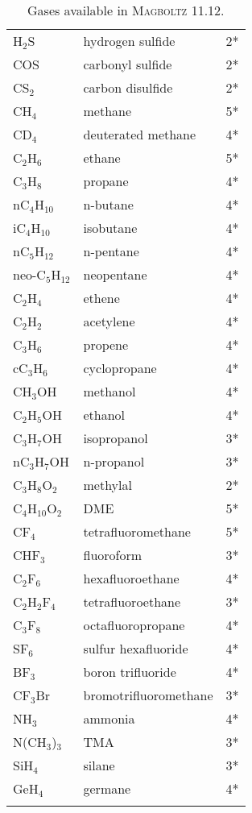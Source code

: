 \begin{appendix}
\begin{longtable}{l l l}
  H\(_{2}\)S & hydrogen sulfide & 2* \\
  COS        & carbonyl sulfide & 2* \\
  CS\(_{2}\) & carbon disulfide & 2* \\
  \midrule
  CH\(_{4}\)           & methane   & 5* \\
  CD\(_{4}\)           & deuterated methane & 4* \\
  C\(_{2}\)H\(_{6}\)   & ethane    & 5* \\
  C\(_{3}\)H\(_{8}\)   & propane   & 4* \\
  nC\(_{4}\)H\(_{10}\) & n-butane  & 4* \\
  iC\(_{4}\)H\(_{10}\) & isobutane & 4* \\ 
  nC\(_{5}\)H\(_{12}\) & n-pentane & 4* \\  
  neo-C\(_{5}\)H\(_{12}\) & neopentane & 4* \\
  C\(_{2}\)H\(_{4}\)   & ethene    & 4* \\
  C\(_{2}\)H\(_{2}\)   & acetylene & 4* \\
  C\(_{3}\)H\(_{6}\)   & propene   & 4* \\
  cC\(_{3}\)H\(_{6}\)   & cyclopropane & 4* \\
  \midrule
  CH\(_{3}\)OH         & methanol        & 4* \\
  C\(_{2}\)H\(_{5}\)OH & ethanol         & 4* \\
  C\(_{3}\)H\(_{7}\)OH & isopropanol     & 3* \\
  nC\(_{3}\)H\(_{7}\)OH & n-propanol     & 3* \\
  C\(_{3}\)H\(_{8}\)O\(_{2}\)  & methylal & 2* \\
  C\(_{4}\)H\(_{10}\)O\(_{2}\) & DME      & 5* \\
  \midrule
  CF\(_{4}\)           & tetrafluoromethane & 5* \\
  CHF\(_{3}\)          & fluoroform         & 3* \\
  C\(_{2}\)F\(_{6}\)   & hexafluoroethane   & 4* \\
  C\(_{2}\)H\(_{2}\)F\(_{4}\) & tetrafluoroethane & 3* \\
  C\(_{3}\)F\(_{8}\)   & octafluoropropane  & 4* \\
  SF\(_{6}\)           & sulfur hexafluoride  & 4* \\
  BF\(_{3}\)           & boron trifluoride    & 4* \\ 
  CF\(_{3}\)Br         & bromotrifluoromethane & 3* \\
  \midrule
  NH\(_{3}\)            & ammonia  & 4* \\
  N(CH\(_{3}\))\(_{3}\) & TMA      & 3* \\
  SiH\(_{4}\)           & silane   & 3* \\
  GeH\(_{4}\)           & germane  & 4* \\
  \bottomrule
  \caption{Gases available in \textsc{Magboltz} 11.12.} 
  \label{Tab:GasesMagboltz11}
\end{longtable}


\end{appendix}

